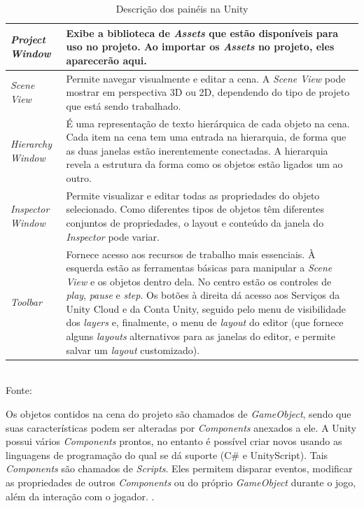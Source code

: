 \documentclass[
	12pt,					%
	openright,				%
	oneside,				%
	a4paper,				%
	bibjustif,				%
	chapter=TITLE,			%
	english,				%
	brazil,					%
	]{abntex2}
\newcommand{\source}[1]{\small Fonte: {#1}}
\begin{document}
			\begin{table}[ht]
				\caption{Descrição dos painéis na Unity}
				\centering
				\small
				\renewcommand{\arraystretch}{1.2} %
				\begin{tabular}{m{3.2cm} m{11.8cm}}
					\hline 
					\textit{Project Window} & Exibe a biblioteca de \textit{Assets} que estão disponíveis para uso no projeto. Ao importar os \textit{Assets} no projeto, eles aparecerão aqui. \\ 
					\hline 
					\textit{Scene View} & Permite navegar visualmente e editar a cena. A \textit{Scene View} pode mostrar em perspectiva 3D ou 2D, dependendo do tipo de projeto que está sendo trabalhado. \\ 
					\hline 
					\textit{Hierarchy Window} & É uma representação de texto hierárquica de cada objeto na cena. Cada item na cena tem uma entrada na hierarquia, de forma que as duas janelas estão inerentemente conectadas. A hierarquia revela a estrutura da forma como os objetos estão ligados um ao outro. \\ 
					\hline 
					\textit{Inspector Window} & Permite visualizar e editar todas as propriedades do objeto selecionado. Como diferentes tipos de objetos têm diferentes conjuntos de propriedades, o layout e conteúdo da janela do \textit{Inspector} pode variar. \\ 
					\hline 
					\textit{Toolbar} & Fornece acesso aos recursos de trabalho mais essenciais. À esquerda estão as ferramentas básicas para manipular a \textit{Scene View} e os objetos dentro dela. No centro estão os controles de \textit{play}, \textit{pause} e \textit{step}. Os botões à direita dá acesso aos Serviços da Unity Cloud e da Conta Unity, seguido pelo menu de visibilidade dos \textit{layers} e, finalmente, o menu de \textit{layout} do editor (que fornece alguns \textit{layouts} alternativos para as janelas do editor, e permite salvar um \textit{layout} customizado). \\ 
					\hline 
				\end{tabular}\\
				\vspace{3mm}
				\source{}
				\label{tab:unity}
			\end{table}
			
			Os objetos contidos na cena do projeto são chamados de \textit{GameObject},
			sendo que suas características podem ser alteradas por \textit{Components} anexados a ele.
			A Unity possui vários \textit{Components} prontos,
			no entanto é possível criar novos usando as linguagens de programação do qual se dá suporte (C\# e UnityScript).
			Tais \textit{Components} são chamados de \textit{Scripts}.
			Eles permitem disparar eventos,
			modificar as propriedades de outros \textit{Components} ou do próprio \textit{GameObject} durante o jogo,
			além da interação com o jogador.
			\cite{unityScripts}.
\end{document}
